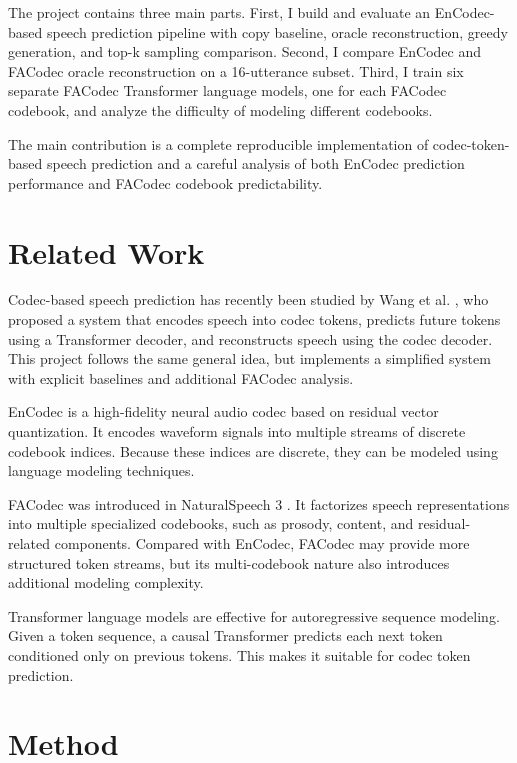 \documentclass{article}
\begin{document}
	The project contains three main parts. First, I build and evaluate an EnCodec-based speech prediction pipeline with copy baseline, oracle reconstruction, greedy generation, and top-k sampling comparison. Second, I compare EnCodec and FACodec oracle reconstruction on a 16-utterance subset. Third, I train six separate FACodec Transformer language models, one for each FACodec codebook, and analyze the difficulty of modeling different codebooks.
	
	The main contribution is a complete reproducible implementation of codec-token-based speech prediction and a careful analysis of both EnCodec prediction performance and FACodec codebook predictability.
	
	\section{Related Work}
	\label{sec:related}
	
	Codec-based speech prediction has recently been studied by Wang et al. \cite{wang2026speech}, who proposed a system that encodes speech into codec tokens, predicts future tokens using a Transformer decoder, and reconstructs speech using the codec decoder. This project follows the same general idea, but implements a simplified system with explicit baselines and additional FACodec analysis.
	
	EnCodec \cite{defossez2023encodec} is a high-fidelity neural audio codec based on residual vector quantization. It encodes waveform signals into multiple streams of discrete codebook indices. Because these indices are discrete, they can be modeled using language modeling techniques.
	
	FACodec was introduced in NaturalSpeech 3 \cite{ju2024naturalspeech3}. It factorizes speech representations into multiple specialized codebooks, such as prosody, content, and residual-related components. Compared with EnCodec, FACodec may provide more structured token streams, but its multi-codebook nature also introduces additional modeling complexity.
	
	Transformer language models \cite{vaswani2017attention} are effective for autoregressive sequence modeling. Given a token sequence, a causal Transformer predicts each next token conditioned only on previous tokens. This makes it suitable for codec token prediction.
	
	\section{Method}
	\label{sec:method}
	
\end{document}
